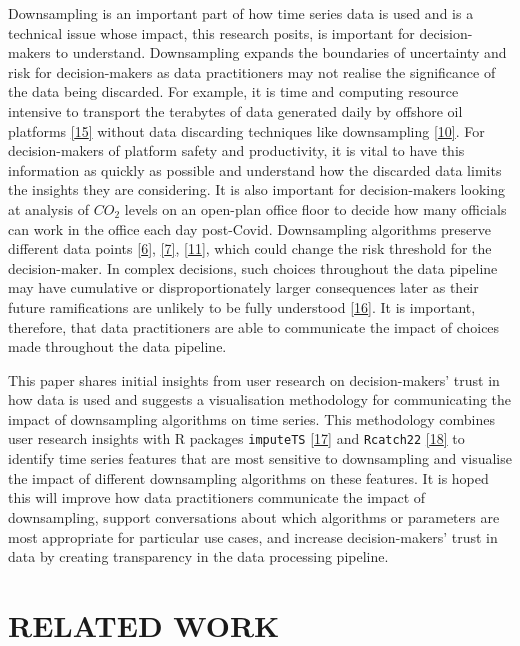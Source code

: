 \documentclass{article}
\begin{document}
Downsampling is an important part of how time series data is used and is
a technical issue whose impact, this research posits, is important for
decision-makers to understand. Downsampling expands the boundaries of
uncertainty and risk for decision-makers as data practitioners may not
realise the significance of the data being discarded. For example, it is
time and computing resource intensive to transport the terabytes of data
generated daily by offshore oil platforms
\protect\hyperlink{ref-CISCO}{{[}15{]}} without data discarding
techniques like downsampling \protect\hyperlink{ref-TVStore}{{[}10{]}}.
For decision-makers of platform safety and productivity, it is vital to
have this information as quickly as possible and understand how the
discarded data limits the insights they are considering. It is also
important for decision-makers looking at analysis of \(CO_2\) levels on
an open-plan office floor to decide how many officials can work in the
office each day post-Covid. Downsampling algorithms preserve different
data points \protect\hyperlink{ref-datapoint}{{[}6{]}},
\protect\hyperlink{ref-MinMaxLTTB}{{[}7{]}},
\protect\hyperlink{ref-Sveinn}{{[}11{]}}, which could change the risk
threshold for the decision-maker. In complex decisions, such choices
throughout the data pipeline may have cumulative or disproportionately
larger consequences later as their future ramifications are unlikely to
be fully understood \protect\hyperlink{ref-challenger}{{[}16{]}}. It is
important, therefore, that data practitioners are able to communicate
the impact of choices made throughout the data pipeline.

This paper shares initial insights from user research on
decision-makers' trust in how data is used and suggests a visualisation
methodology for communicating the impact of downsampling algorithms on
time series. This methodology combines user research insights with R
packages \texttt{imputeTS} \protect\hyperlink{ref-imputeTS_R}{{[}17{]}}
and \texttt{Rcatch22} \protect\hyperlink{ref-catch22_R}{{[}18{]}} to
identify time series features that are most sensitive to downsampling
and visualise the impact of different downsampling algorithms on these
features. It is hoped this will improve how data practitioners
communicate the impact of downsampling, support conversations about
which algorithms or parameters are most appropriate for particular use
cases, and increase decision-makers' trust in data by creating
transparency in the data processing pipeline.

\hypertarget{related-work}{%
\section{RELATED WORK}\label{related-work}}
\end{document}
